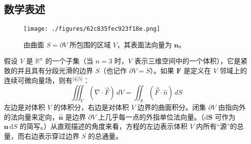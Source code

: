 \subsection{数学表述}
\begin{figure}[ht]
\centering
\texttt{[image: ./figures/62c835fec923f18e.png]}
\caption{由曲面 $S = \partial V$ 所包围的区域 $V$，其表面法向量为 $\mathbf{n}$。} \label{fig_GSsd_1}
\end{figure}
假设 $V$ 是 $\mathbb{R}^n$ 的一个子集（当 $n = 3$ 时，$V$ 表示三维空间中的一个体积），它是紧致的并且具有分段光滑的边界 $S$（也记作 $\partial V = S$）。如果 $\mathbf{F}$ 是定义在 $V$ 邻域上的连续可微向量场，则有\(^\text{[4][5]}\)：
$$
\iiint_V (\nabla \cdot \vec{F}) \, dV 
= 
\iint_S (\vec{F} \cdot \hat{n}) \, dS~
$$
左边是对体积 $V$ 的体积分，右边是对体积 $V$ 边界的曲面积分。闭集 $\partial V$ 由指向外的法向量来定向，$\mathbf{\hat{n}}$ 是边界 $\partial V$ 上几乎每一点的外指单位法向量。（$\mathrm{d}\mathbf{S}$ 可作为 $\mathbf{n}\,\mathrm{d}S$ 的简写。）从直观描述的角度来看，方程的左边表示体积 $V$ 内所有“源”的总量，而右边表示穿过边界 $S$ 的总通量。
